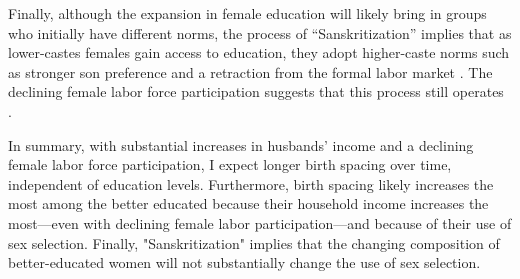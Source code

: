 Finally, although the expansion in female education will likely bring in groups who 
initially have different norms, the process of ``Sanskritization'' implies that as 
lower-castes females gain access to education, they adopt higher-caste norms such as stronger son 
preference and a retraction from the formal labor market \citep{Srinivas1956}.
The declining female labor force participation suggests that this process still 
operates \citep{Abraham2013,Chatterjee2018}.

In summary, with substantial increases in husbands' income and a declining female labor 
force participation, I expect longer birth spacing over time, independent of education 
levels.
Furthermore, birth spacing likely increases the most among the better educated 
because their household income increases the most---even with declining female labor 
participation---and because of their use of sex selection.
Finally, "Sanskritization" implies that the changing composition of better-educated
women will not substantially change the use of sex selection.






